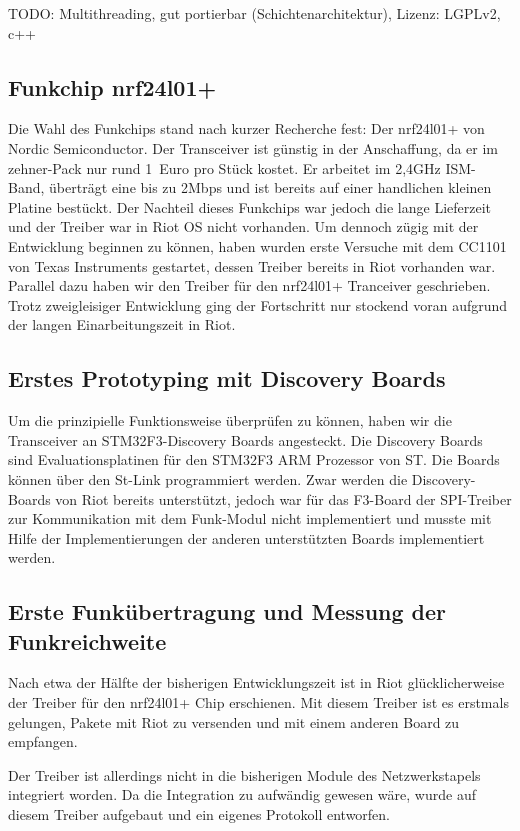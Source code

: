 \documentclass{IEEEtran}
\begin{document}
        TODO: Multithreading, gut portierbar (Schichtenarchitektur), Lizenz: LGPLv2, c++

    \subsection{Funkchip nrf24l01+}
        Die Wahl des Funkchips stand nach kurzer Recherche fest: Der nrf24l01+ von Nordic Semiconductor. Der Transceiver ist günstig in der Anschaffung, da er im zehner-Pack nur rund 1~Euro pro Stück kostet. Er arbeitet im 2,4GHz ISM-Band, überträgt eine bis zu 2Mbps und ist bereits auf einer handlichen kleinen Platine bestückt. Der Nachteil dieses Funkchips war jedoch die lange Lieferzeit und der Treiber war in Riot OS nicht vorhanden.
        Um dennoch zügig mit der Entwicklung beginnen zu können, haben wurden erste Versuche mit dem CC1101 von Texas Instruments gestartet, dessen Treiber bereits in Riot vorhanden war. Parallel dazu haben wir den Treiber für den nrf24l01+ Tranceiver geschrieben. Trotz zweigleisiger Entwicklung ging der Fortschritt nur stockend voran aufgrund der langen Einarbeitungszeit in Riot.

    \subsection{Erstes Prototyping mit Discovery Boards}
    Um die prinzipielle Funktionsweise überprüfen zu können, haben wir die Transceiver an STM32F3-Discovery Boards angesteckt. Die Discovery Boards sind Evaluationsplatinen für den STM32F3 ARM Prozessor von ST. Die Boards können über den St-Link programmiert werden.
    Zwar werden die Discovery-Boards von Riot bereits unterstützt, jedoch war für das F3-Board der SPI-Treiber zur Kommunikation mit dem Funk-Modul nicht implementiert und musste mit Hilfe der Implementierungen der anderen unterstützten Boards implementiert werden.

    \subsection{Erste Funkübertragung und Messung der Funkreichweite}
        Nach etwa der Hälfte der bisherigen Entwicklungszeit ist in Riot glücklicherweise der Treiber für den nrf24l01+ Chip erschienen. Mit diesem Treiber ist es erstmals gelungen, Pakete mit Riot zu versenden und mit einem anderen Board zu empfangen.
        
        Der Treiber ist allerdings nicht in die bisherigen Module des Netzwerkstapels integriert worden. Da die Integration zu aufwändig gewesen wäre, wurde auf diesem Treiber aufgebaut und ein eigenes Protokoll entworfen.
 
\end{document}
